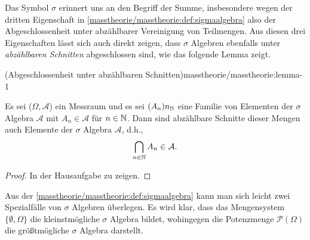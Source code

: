 \par
Das Symbol \(\sigma\) erinnert uns an den Begriff der Summe, insbesondere wegen der dritten Eigenschaft in \cref{masstheorie/masstheorie:def:sigmaalgebra}  also der Abgeschlossenheit unter abzählbarer Vereinigung von Teilmengen.
Aus diesen drei Eigenschaften lässt sich auch direkt zeigen, dass \(\sigma\) Algebren ebenfalls unter \emph{abzählbaren Schnitten} abgeschlossen sind, wie das folgende Lemma zeigt.
\begin{lemma}{(Abgeschlossenheit unter abzählbaren Schnitten)}{masstheorie/masstheorie:lemma-1}



\par
Es sei (\(\Omega,\mathcal{A}\)) ein Messraum und es sei \((A_n)n_{\mathbb{N}}\) eine Familie von Elementen der \(\sigma\) Algebra \(\mathcal{A}\) mit \(A_n \in \mathcal{A}\) für \(n \in \mathbb{N}\).
Dann sind abzählbare Schnitte dieser Mengen auch Elemente der \(\sigma\) Algebra \(\mathcal{A}\), d.h.,
\begin{align*}
\bigcap_{n \in \mathbb{N}} A_n \in \mathcal{A}.
\end{align*}\end{lemma}

\begin{proof}
 In der Hausaufgabe zu zeigen.
\end{proof}

\par
Aus der \cref{masstheorie/masstheorie:def:sigmaalgebra} kann man sich leicht zwei Spezialfälle von \(\sigma\) Algebren überlegen.
Es wird klar, dass das Mengensystem \(\{\emptyset, \Omega\}\) die kleinstmögliche \(\sigma\) Algebra bildet, wohingegen die Potenzmenge \(\mathcal{P}(\Omega)\) die größtmögliche \(\sigma\) Algebra darstellt.

